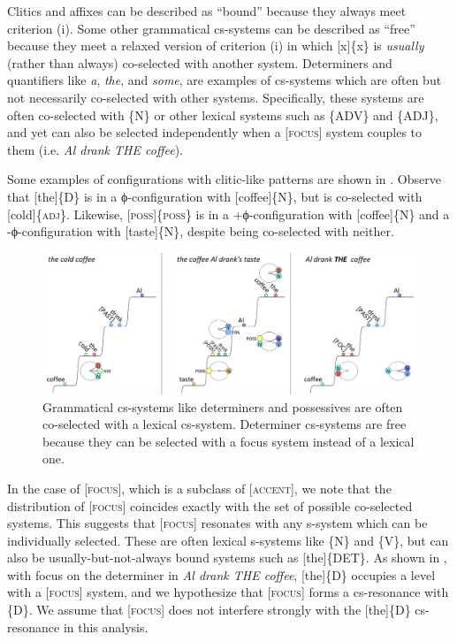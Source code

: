   Clitics and affixes can be described as “bound” because they always meet criterion (i). Some other grammatical cs-systems can be described as “free” because they meet a relaxed version of criterion (i) in which [x]\{x\} is \textit{usually} (rather than always) co-selected with another system. Determiners and quantifiers like \textit{a}, \textit{the}, and \textit{some}, are examples of cs-systems which are often but not necessarily co-selected with other systems. Specifically, these systems are often co-selected with \{N\} or other lexical systems such as \{A\textsc{DV}\} and \{A\textsc{DJ}\}, and yet can also be selected independently when a [\textsc{focus}] system couples to them (i.e. \textit{Al drank THE coffee}).

  Some examples of configurations with clitic-like patterns are shown in {}. Observe that [the]\{\textsc{D}\} is in a ϕ-configuration with [coffee]\{N\}, but is co-selected with [cold]\{\textsc{adj}\}. Likewise, [\textsc{poss}]\{\textsc{poss}\} is in a +ϕ-configuration with [coffee]\{N\} and a -ϕ-configuration with [taste]\{N\}, despite being co-selected with neither. 

  
\begin{figure}
\includegraphics[width=\textwidth]{figures/Tilsen-img68.png}
\caption{Grammatical cs-systems like determiners and possessives are often co-selected with a lexical cs-system. Determiner cs-systems are free because they can be selected with a focus system instead of a lexical one.}
\label{fig:4:18}
\end{figure}
 

  In the case of [\textsc{focus}], which is a subclass of [\textsc{accent}], we note that the distribution of [\textsc{focus}] coincides exactly with the set of possible co-selected systems. This suggests that [\textsc{focus}] resonates with any s-system which can be individually selected. These are often lexical s-systems like \{N\} and \{V\}, but can also be usually-but-not-always bound systems such as [the]\{DET\}. As shown in {}, with focus on the determiner in \textit{Al drank THE coffee}, [the]\{D\} occupies a level with a [\textsc{focus}] system, and we hypothesize that [\textsc{focus}] forms a cs-resonance with \{D\}. We assume that [\textsc{focus}] does not interfere strongly with the [the]\{D\} cs-resonance in this analysis.

